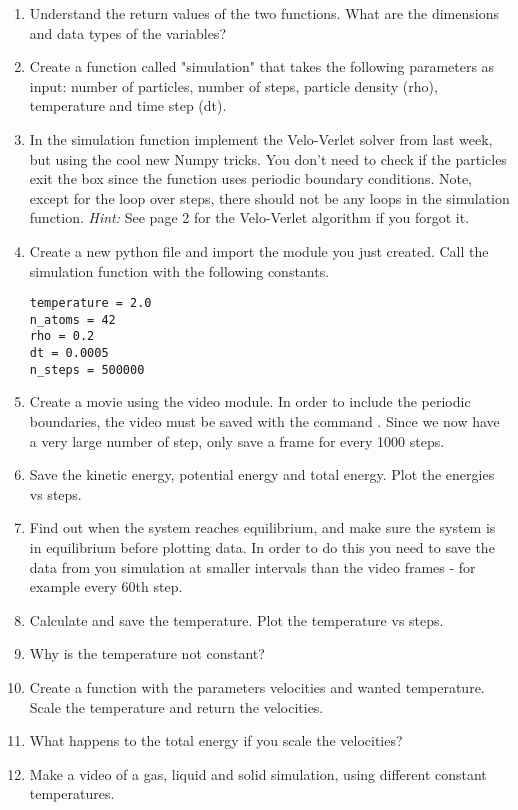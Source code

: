 \documentclass{article}
\begin{document}
\begin{enumerate}[resume]
    \item Understand the return values of the two functions.
        What are the dimensions and data types of the variables?

 
    \item Create a function called "simulation" that takes the following parameters as input:
        number of particles,
        number of steps,
        particle density (rho),
        temperature and
        time step (dt).


    \item In the simulation function implement the Velo-Verlet solver from last week, but using the cool new Numpy tricks.
        You don't need to check if the particles exit the box since the  function uses periodic boundary conditions.
        Note, except for the loop over steps, there should not be any loops in the simulation function.
       {\em Hint:} See page 2 for the Velo-Verlet algorithm if you forgot it.


    \item Create a new python file and import the module you just created. Call the simulation function with the following constants.
\begin{lstlisting}
temperature = 2.0
n_atoms = 42
rho = 0.2
dt = 0.0005
n_steps = 500000
\end{lstlisting}


    \item Create a movie using the video module. In order to include the periodic boundaries, the video must be saved with the command 
    . Since we now have a very large number of step, only save a frame for every 1000 steps.

    \item Save the kinetic energy, potential energy and total energy.
        Plot the energies vs steps.

    \item Find out when the system reaches equilibrium, and make sure the system is in equilibrium before plotting data. In order to do this you need to save the data from you simulation at smaller intervals than the video frames - for example every 60th step.

    \item Calculate and save the temperature.
        Plot the temperature vs steps.

    \item Why is the temperature not constant?

    \item Create a function  with the parameters velocities and wanted temperature.
        Scale the temperature and return the velocities.
        
    \item What happens to the total energy if you scale the velocities?

    \item Make a video of a gas, liquid and solid simulation, using different constant temperatures.

\end{enumerate}
\end{document}
